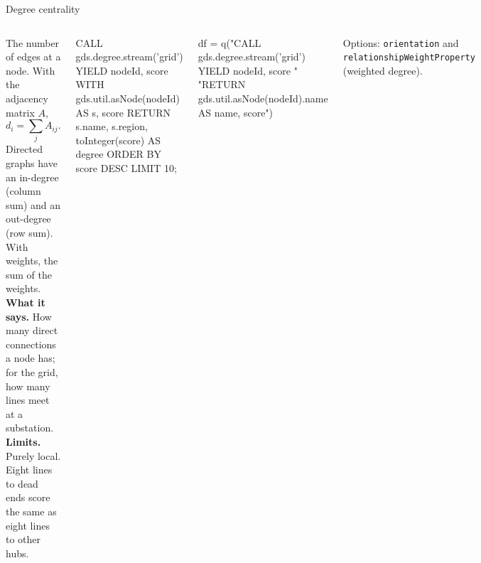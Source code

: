 \documentclass[aspectratio=169, 10pt]{beamer}
\newcommand{\kicker}[1]{{\color{muted}\small #1}}
\begin{document}
\begin{frame}[fragile]{Degree centrality}
  \vspace{0.1cm}
  \begin{columns}[T]
      \small
      The number of edges at a node. With the adjacency matrix $A$,
      \[ d_i = \sum_{j} A_{ij}. \]
      Directed graphs have an in-degree (column sum) and an out-degree (row sum). With weights, the sum of the weights.\\[5pt]
      \textbf{What it says.} How many direct connections a node has; for the grid, how many lines meet at a substation.\\[5pt]
      \textbf{Limits.} Purely local. Eight lines to dead ends score the same as eight lines to other hubs.
      \begin{code}
CALL gds.degree.stream('grid')
YIELD nodeId, score
WITH gds.util.asNode(nodeId) AS s, score
RETURN s.name, s.region, toInteger(score) AS degree
ORDER BY score DESC LIMIT 10;
      \end{code}
      \begin{codesmall}[Python]
df = q("CALL gds.degree.stream('grid') YIELD nodeId, score "
       "RETURN gds.util.asNode(nodeId).name AS name, score")
      \end{codesmall}
      \kicker{Options: \texttt{orientation} and \texttt{relationshipWeightProperty} (weighted degree).}
  \end{columns}
\end{frame}
\end{document}
